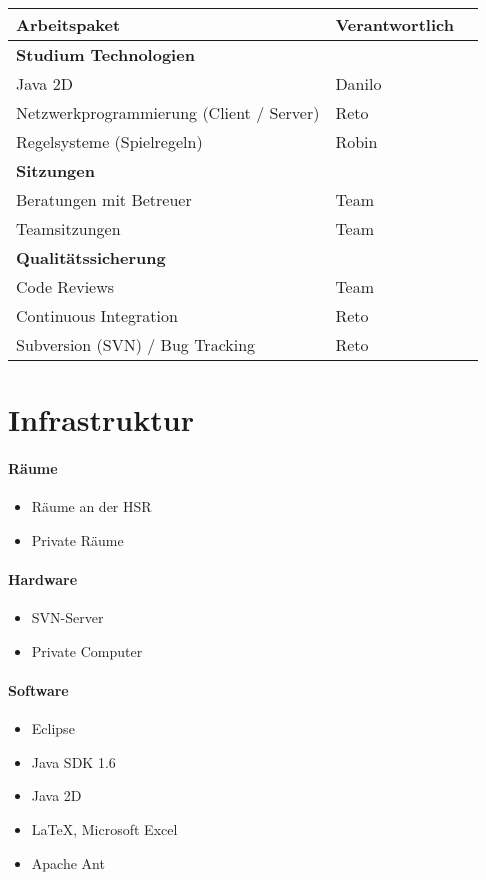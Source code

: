 \documentclass[a4paper,12pt,halfparskip,DIV14]{scrreprt}
\begin{document}
\begin{tabular}{@{} l l l @{}}
\toprule
Arbeitspaket & Verantwortlich \\
\midrule
\textbf{Studium Technologien} &  & \\
Java 2D & Danilo & \\
Netzwerkprogrammierung (Client / Server) & Reto & \\
Regelsysteme (Spielregeln) & Robin & \\
\midrule
\textbf{Sitzungen} &  & \\
Beratungen mit Betreuer & Team & \\
Teamsitzungen & Team & \\
\midrule
\textbf{Qualitätssicherung} &  & \\
Code Reviews & Team & \\
Continuous Integration & Reto & \\
Subversion (SVN) / Bug Tracking & Reto & \\
\bottomrule
\end{tabular}


\section{Infrastruktur}

\paragraph{Räume}
\begin{itemize}
	\item Räume an der HSR
	\item Private Räume
\end{itemize}

\paragraph{Hardware}
\begin{itemize}
	\item SVN-Server
	\item Private Computer
\end{itemize}

\paragraph{Software}
\begin{itemize}
	\item Eclipse
	\item Java SDK 1.6
	\item Java 2D
	\item \LaTeX{}, Microsoft Excel
	\item Apache Ant
\end{itemize}
\end{document}
